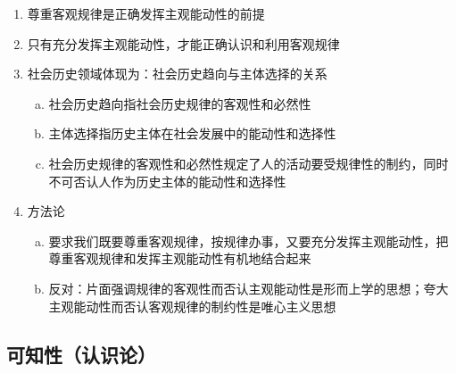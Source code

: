 \documentclass[12pt]{book}
\begin{document}
\begin{enumerate}[1.]
{              \begin{enumerate}[(1)]
                  \item 尊重客观规律是正确发挥主观能动性的前提
                  \item 只有充分发挥主观能动性，才能正确认识和利用客观规律
                  \item 社会历史领域体现为：社会历史趋向与主体选择的关系
                        \begin{enumerate}[a.]
                            \item 社会历史趋向指社会历史规律的客观性和必然性
                            \item 主体选择指历史主体在社会发展中的能动性和选择性
                            \item 社会历史规律的客观性和必然性规定了人的活动要受规律性的制约，同时不可否认人作为历史主体的能动性和选择性
                        \end{enumerate}
                  \item 方法论
                        \begin{enumerate}[a.]
                            \item 要求我们既要尊重客观规律，按规律办事，又要充分发挥主观能动性，把尊重客观规律和发挥主观能动性有机地结合起来
                            \item 反对：片面强调规律的客观性而否认主观能动性是形而上学的思想；夸大主观能动性而否认客观规律的制约性是唯心主义思想
                        \end{enumerate}
              \end{enumerate}
          }
\end{enumerate}






\subsection{可知性（认识论）}
\end{document}
